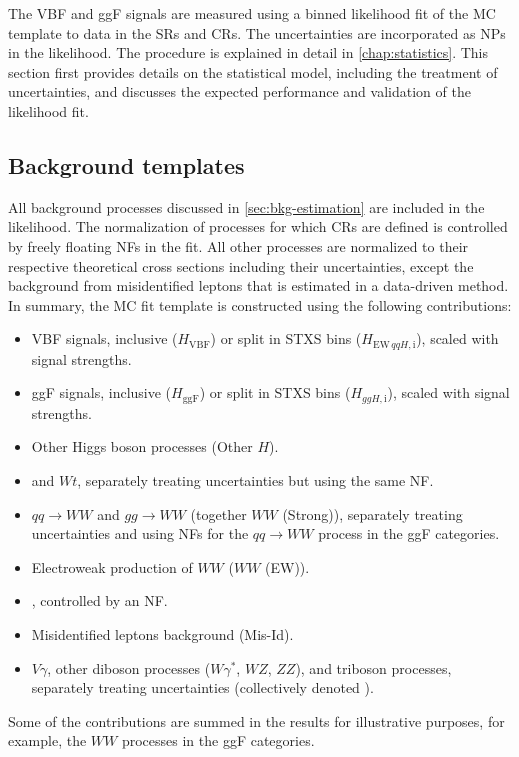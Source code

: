 
The VBF and ggF signals are measured using a binned likelihood fit of the MC template to data in the SRs and CRs. The uncertainties are incorporated as NPs in the likelihood. The procedure is explained in detail in \cref{chap:statistics}. 
This section first provides details on the statistical model, including the treatment of uncertainties, and discusses the expected performance and validation of the likelihood fit.


\subsection{Background templates}
All background processes discussed in \cref{sec:bkg-estimation} are included in the likelihood. 
The normalization of processes for which CRs are defined is controlled by freely floating NFs in the fit. All other processes are normalized to their respective theoretical cross sections including their uncertainties, except the background from misidentified leptons that is estimated in a data-driven method.
In summary, the MC fit template is constructed using the following contributions:
\begin{itemize}
    \item VBF signals, inclusive ($H_{\mathrm{VBF}}$) or split in STXS bins ($H_{\mathrm{EW\,} qqH\mathrm{, i}}$), scaled with signal strengths.
    \item ggF signals, inclusive ($H_{\mathrm{ggF}}$) or split in STXS bins ($H_{ggH\mathrm{, i}}$), scaled with signal strengths.
    \item Other Higgs boson processes (Other $H$).
    \item \ttbar and $Wt$, separately treating uncertainties but using the same NF.
    \item $qq \to WW$ and $gg \to WW$ (together $WW$ (Strong)), separately treating uncertainties and using NFs for the $qq \to WW$ process in the ggF categories.
    \item Electroweak production of $WW$ ($WW$ (EW)).
    \item \Zgamma, controlled by an NF.
    \item Misidentified leptons background (Mis-Id).
    \item $V\gamma$, other diboson processes ($W\gamma^*$, $WZ$, $ZZ$), and triboson processes, separately treating uncertainties (collectively denoted \OtherVVV).
\end{itemize}
Some of the contributions are summed in the results for illustrative purposes, for example, the $WW$ processes in the ggF categories. 


